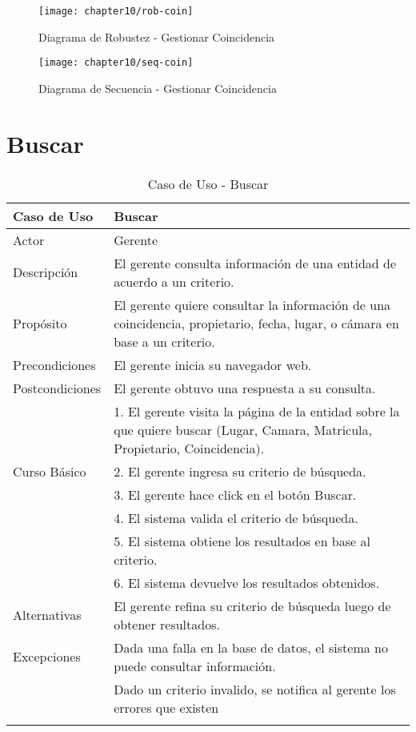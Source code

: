     \begin{figure}[H]
        \centering
        \texttt{[image: chapter10/rob-coin]}
        \caption{Diagrama de Robustez - Gestionar Coincidencia}
        \label{fig:rob-coin}
    \end{figure}
    \begin{landscape}
    
    \begin{figure}[H]
        \centering
        \texttt{[image: chapter10/seq-coin]}
        \caption{Diagrama de Secuencia - Gestionar Coincidencia }
        \label{fig:seq-coin}
    \end{figure}
    \end{landscape}
    
    
\section{Buscar}
\begin{longtable}{@{} p{3cm} p{10cm} @{}} \toprule
    \textbf{Caso de Uso}    & Buscar\\ \midrule
    Actor                   & Gerente \\ \cmidrule{1-2}
    Descripción             & El gerente consulta información de una entidad de acuerdo a un criterio. \\ \cmidrule{1-2}
    Propósito               & El gerente quiere consultar la información de una coincidencia, propietario, fecha, lugar, o cámara en base a un criterio. \\ \cmidrule{1-2}
    Precondiciones          & El gerente inicia su navegador web. \\ \cmidrule{1-2} 
    Postcondiciones         & El gerente obtuvo una respuesta a su consulta. \\ \cmidrule{1-2} 
                            & 1. El gerente visita la página de la entidad sobre la que quiere buscar (Lugar, Camara, Matricula, Propietario, Coincidencia). \\ 
    Curso Básico            & 2. El gerente ingresa su criterio de búsqueda. \\
                            & 3. El gerente hace click en el botón Buscar. \\
                            & 4. El sistema valida el criterio de búsqueda. \\
                            & 5. El sistema obtiene los resultados en base al criterio. \\
                            & 6. El sistema devuelve los resultados obtenidos. \\ \cmidrule{1-2}
    Alternativas            & El gerente refina su criterio de búsqueda luego de obtener resultados. \\ \bottomrule
    Excepciones             & Dada una falla en la base de datos, el sistema no puede consultar información. \\ 
                            & Dado un criterio invalido, se notifica al gerente los errores que existen\\  \bottomrule
   \caption{Caso de Uso - Buscar} \label{tab:tabcu-coin}  \\
   \end{longtable}
   
